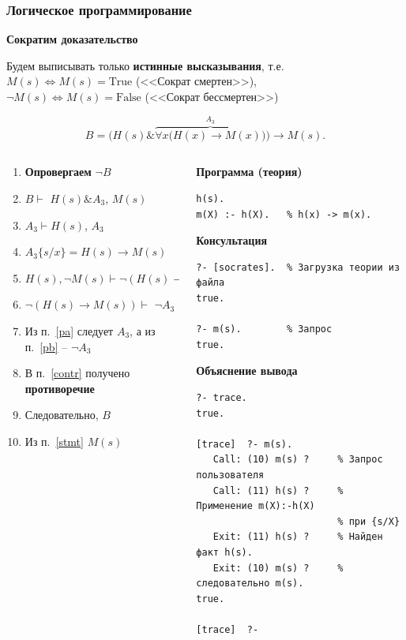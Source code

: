 \documentclass[10pt]{beamer}
\newcommand{\Tr}{\mbox{True}}
\newcommand{\Fa}{\mbox{False}}
\begin{document}
\begin{frame}[fragile]
  \frametitle{Логическое программирование}

  \textbf{Сократим доказательство}

  Будем выписывать только \textbf{истинные высказывания}, т.е.
  $M(s) \Leftrightarrow M(s) = \Tr$ (<<Сократ смертен>>),\\
  $\neg M(s) \Leftrightarrow M(s) = \Fa$ (<<Сократ бессмертен>>)

$$
B = \Big (H(s) \& \overbrace{\forall x \big ( H(x)\to M(x)\big )}^{A_3} \Big ) \to M(s).
$$

\begin{columns}
  \begin{column}{0.5\textwidth}\footnotesize
    \begin{enumerate}
    \item \textbf{Опровергаем} $\neg B$
    \item $B\vdash$ $H(s) \& A_3$, $M(s)$
    \item $A_3 \vdash H(s)$, {\color{red}$A_3$} \label{pa}
    \item $A_3\{s/x\} = H(s)\to M(s)$
    \item $H(s), \neg M(s) \vdash \neg (H(s)\to M(s))$
    \item $\neg(H(s)\to M(s))\vdash$ {\color{blue} $\neg A_3$} \label{pb}
    \item Из п.~\ref{pa} следует {\color{red}$A_3$}, а из п.~\ref{pb} -- {\color{blue} $\neg A_3$} \label{contr}
    \item В п.~\ref{contr} получено \textbf{противоречие}
    \item Следовательно, $B$ \label{stmt}
    \item Из п.~\ref{stmt} $M(s)$ \square
    \end{enumerate}
    \vspace{2.7em}
    \mbox{}
  \end{column}
  \begin{column}{0.5\textwidth}
    \textbf{\footnotesize Программа (теория)}
\begin{verbatim}
h(s).
m(X) :- h(X).   % h(x) -> m(x).
\end{verbatim}
    \textbf{\footnotesize Консультация}
\begin{verbatim}
?- [socrates].  % Загрузка теории из файла
true.

?- m(s).        % Запрос
true.
\end{verbatim}
\textbf{\footnotesize Объяснение вывода}
\begin{verbatim}
?- trace.
true.

[trace]  ?- m(s).
   Call: (10) m(s) ?     % Запрос пользователя
   Call: (11) h(s) ?     % Применение m(X):-h(X)
                         % при {s/X}
   Exit: (11) h(s) ?     % Найден факт h(s).
   Exit: (10) m(s) ?     % следовательно m(s).
true.

[trace]  ?-
\end{verbatim}
  \end{column}
\end{columns}
\end{frame}
\end{document}
